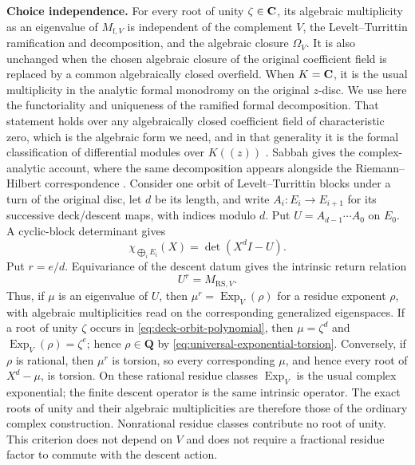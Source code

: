 \noindent\textbf{Choice independence.}
For every root of unity \(\zeta\in\mathbf C\), its algebraic multiplicity as an
eigenvalue of \(M_{\mathrm f,V}\) is independent of the complement \(V\), the
Levelt--Turrittin ramification and decomposition, and the algebraic closure
\(\Omega_V\).  It is also unchanged when the chosen algebraic closure of the
original coefficient field is replaced by a common algebraically closed
overfield.  When \(K=\mathbf C\), it is the usual multiplicity in the analytic
formal monodromy on the original \(z\)-disc.
We use here the functoriality and uniqueness of the ramified formal
decomposition.  That statement holds over any algebraically closed coefficient
field of characteristic zero, which is the algebraic form we need, and in that
generality it is the formal classification of differential modules over
\(K(\!(z)\!)\) \cite[Chapter~3]{PutSinger}.  Sabbah gives the
complex-analytic account, where the same decomposition appears alongside the
Riemann--Hilbert correspondence
\cite[Lecture~5, Section~5.c, proofs of Theorem~5.8 and
Proposition~5.10]{SabbahStokes}.
Consider one orbit of Levelt--Turrittin blocks under a turn of the original
disc, let \(d\) be its length, and write
\(A_i:E_i\longrightarrow E_{i+1}\) for its successive deck/descent maps,
with indices modulo \(d\).  Put
\(U=A_{d-1}\cdots A_0\) on \(E_0\).  A cyclic-block determinant gives
\[
 \chi_{\bigoplus_iE_i}(X)=\det(X^dI-U).
 \label{eq:deck-orbit-polynomial}
\]
Put \(r=e/d\).  Equivariance of the descent datum gives the intrinsic return
relation
\[
 U^r=M_{\mathrm{RS},V}.
 \label{eq:deck-return-power}
\]
Thus, if \(\mu\) is an eigenvalue of \(U\), then
\(\mu^r=\operatorname{Exp}_V(\rho)\) for a residue exponent \(\rho\), with
algebraic multiplicities read on the corresponding generalized eigenspaces.
If a root of unity \(\zeta\) occurs in
\eqref{eq:deck-orbit-polynomial}, then \(\mu=\zeta^d\) and
\(\operatorname{Exp}_V(\rho)=\zeta^e\); hence \(\rho\in\mathbf Q\) by
\eqref{eq:universal-exponential-torsion}.  Conversely, if \(\rho\) is
rational, then \(\mu^r\) is torsion, so every corresponding \(\mu\), and
hence every root of \(X^d-\mu\), is torsion.  On these rational residue
classes \(\operatorname{Exp}_V\) is the usual complex exponential; the
finite descent operator is the same intrinsic operator.  The exact roots of
unity and their algebraic multiplicities are therefore those of the ordinary
complex construction.  Nonrational residue classes contribute no root of
unity.  This criterion does not depend on \(V\) and does not require a
fractional residue factor to commute with the descent action.

